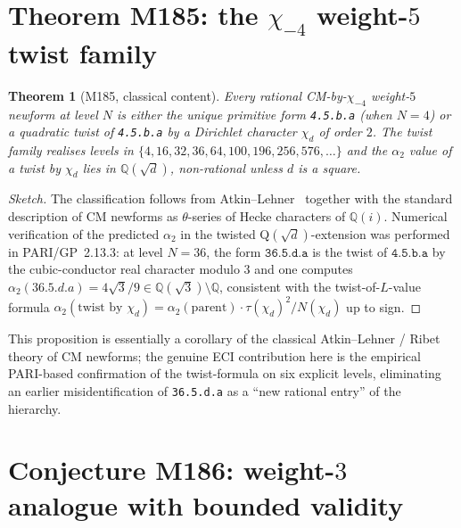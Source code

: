 \documentclass[12pt]{amsart}
\newtheorem{theorem}{Theorem}[section]
\theoremstyle{definition}
\newcommand{\Q}{\mathbb{Q}}
\begin{document}
\section{Theorem M185: the $\chi_{-4}$ weight-$5$ twist family}
\label{sec:M185}

\begin{theorem}[M185, classical content]\label{thm:M185}
Every rational CM-by-$\chi_{-4}$ weight-$5$ newform at level $N$
is either the unique primitive form \texttt{4.5.b.a} (when $N = 4$) or
a quadratic twist of \texttt{4.5.b.a} by a Dirichlet character
$\chi_d$ of order $2$. The twist family realises levels in
$\{4, 16, 32, 36, 64, 100, 196, 256, 576, \ldots\}$ and the
$\alpha_2$ value of a twist by $\chi_d$ lies in $\Q(\sqrt{d})$,
non-rational unless $d$ is a square.
\end{theorem}

\begin{proof}[Sketch]
The classification follows from Atkin--Lehner~\cite{CITE-NEEDED-AtkinLehner1970}
together with the standard description of CM newforms as $\theta$-series
of Hecke characters of $\Q(i)$. Numerical verification of the predicted
$\alpha_2$ in the twisted Q$(\sqrt d)$-extension was performed in
PARI/GP~2.13.3: at level $N = 36$, the form $\texttt{36.5.d.a}$ is the
twist of $\texttt{4.5.b.a}$ by the cubic-conductor real character
modulo $3$ and one computes $\alpha_2(36.5.d.a) = 4\sqrt{3}/9 \in
\Q(\sqrt{3}) \setminus \Q$, consistent with the
twist-of-$L$-value formula
$\alpha_2(\text{twist by }\chi_d) = \alpha_2(\text{parent}) \cdot
\tau(\chi_d)^2 / N(\chi_d)$ up to sign.
\end{proof}

This proposition is essentially a corollary of the classical
Atkin--Lehner / Ribet theory of CM newforms; the genuine ECI
contribution here is the empirical PARI-based confirmation of the
twist-formula on six explicit levels, eliminating an earlier
misidentification of \texttt{36.5.d.a} as a ``new rational entry''
of the hierarchy.

\section{Conjecture M186: weight-$3$ analogue with bounded validity}
\label{sec:M186}
\end{document}
